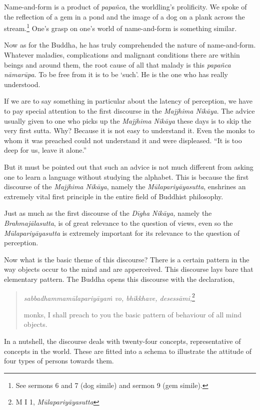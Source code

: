 Name-and-form is a product of \emph{papañca}, the worldling's prolificity. We spoke of the reflection of a gem in a pond and the image of a dog on a plank across the stream.\footnote{See sermons 6 and 7 (dog simile) and sermon 9 (gem simile).} One's grasp on one's world of name-and-form is something similar.

Now as for the Buddha, he has truly comprehended the nature of name-and-form. Whatever maladies, complications and malignant conditions there are within beings and around them, the root cause of all that malady is this \emph{papañca nāmarūpa}. To be free from it is to be `such'. He is the one who has really understood.

If we are to say something in particular about the latency of perception, we have to pay special attention to the first discourse in the \emph{Majjhima Nikāya}. The advice usually given to one who picks up the \emph{Majjhima Nikāya} these days is to skip the very first sutta. Why? Because it is not easy to understand it. Even the monks to whom it was preached could not understand it and were displeased. ``It is too deep for us, leave it alone.''

But it must be pointed out that such an advice is not much different from asking one to learn a language without studying the alphabet. This is because the first discourse of the \emph{Majjhima Nikāya}, namely the \emph{Mūlapariyāyasutta}, enshrines an extremely vital first principle in the entire field of Buddhist philosophy.

Just as much as the first discourse of the \emph{Dīgha Nikāya,} namely the \emph{Brahmajālasutta}, is of great relevance to the question of views, even so the \emph{Mūlapariyāyasutta} is extremely important for its relevance to the question of perception.

Now what is the basic theme of this discourse? There is a certain pattern in the way objects occur to the mind and are apperceived. This discourse lays bare that elementary pattern. The Buddha opens this discourse with the declaration,

\begin{quote}
\emph{sabbadhammamūlapariyāyaṁ vo, bhikkhave, desessāmi,}\footnote{M I 1, \emph{Mūlapariyāyasutta}}

monks, I shall preach to you the basic pattern of behaviour of all mind objects.
\end{quote}

In a nutshell, the discourse deals with twenty-four concepts, representative of concepts in the world. These are fitted into a schema to illustrate the attitude of four types of persons towards them.

